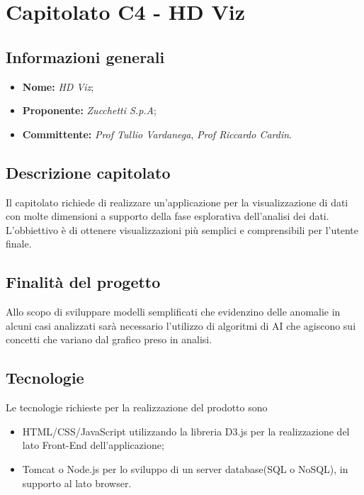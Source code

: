 \section{Capitolato C4 - HD Viz}

\subsection{Informazioni generali}

\begin{itemize}
\item \textbf{Nome:} \textit{HD Viz};
\item \textbf{Proponente:} \textit{Zucchetti S.p.A};
\item \textbf{Committente:} \emph{Prof Tullio Vardanega}, \emph{Prof Riccardo Cardin}.
\end{itemize}

\subsection{Descrizione capitolato}
Il capitolato richiede di realizzare un'applicazione per la
visualizzazione di dati con molte dimensioni a supporto della fase esplorativa
dell'analisi dei dati. L'obbiettivo è di ottenere visualizzazioni più semplici e comprensibili per l'utente finale. 

\subsection{Finalità del progetto}
Allo scopo di sviluppare modelli semplificati che evidenzino delle anomalie in alcuni casi analizzati sarà necessario l'utilizzo di algoritmi di AI che agiscono sui concetti che variano dal grafico preso in analisi.
 
\subsection{Tecnologie}
Le tecnologie richieste per la realizzazione del prodotto sono 
\begin{itemize}
\item HTML/CSS/JavaScript utilizzando la libreria D3.js per la realizzazione del lato Front-End dell'applicazione;
\item Tomcat o Node.js per lo sviluppo di un server database(SQL o NoSQL), in supporto al lato browser.
\end{itemize}

